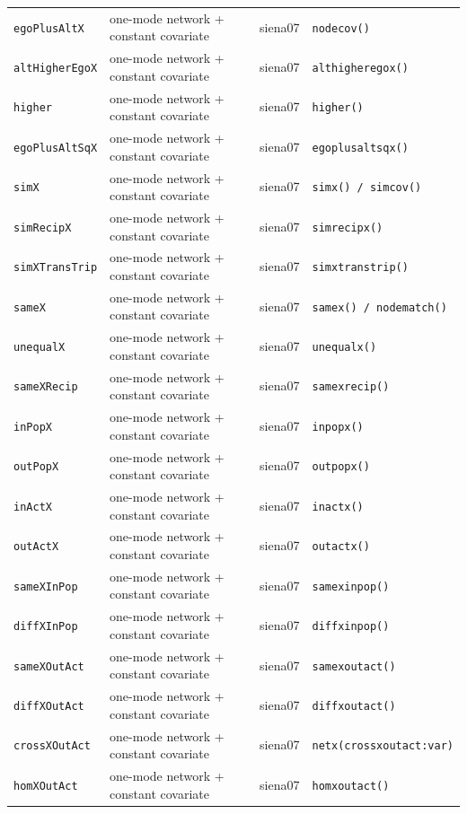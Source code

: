 \begin{longtable}{@{}p{2.6cm}p{3.2cm}p{2.9cm}p{5.4cm}@{}}
\texttt{egoPlusAltX} & one-mode network + constant covariate & siena07 & \texttt{nodecov()}\\
\texttt{altHigherEgoX} & one-mode network + constant covariate & siena07 & \texttt{althigheregox()}\\
\texttt{higher} & one-mode network + constant covariate & siena07 & \texttt{higher()}\\
\texttt{egoPlusAltSqX} & one-mode network + constant covariate & siena07 & \texttt{egoplusaltsqx()}\\
\texttt{simX} & one-mode network + constant covariate & siena07 & \texttt{simx() / simcov()}\\
\texttt{simRecipX} & one-mode network + constant covariate & siena07 & \texttt{simrecipx()}\\
\texttt{simXTransTrip} & one-mode network + constant covariate & siena07 & \texttt{simxtranstrip()}\\
\texttt{sameX} & one-mode network + constant covariate & siena07 & \texttt{samex() / nodematch()}\\
\texttt{unequalX} & one-mode network + constant covariate & siena07 & \texttt{unequalx()}\\
\texttt{sameXRecip} & one-mode network + constant covariate & siena07 & \texttt{samexrecip()}\\
\texttt{inPopX} & one-mode network + constant covariate & siena07 & \texttt{inpopx()}\\
\texttt{outPopX} & one-mode network + constant covariate & siena07 & \texttt{outpopx()}\\
\texttt{inActX} & one-mode network + constant covariate & siena07 & \texttt{inactx()}\\
\texttt{outActX} & one-mode network + constant covariate & siena07 & \texttt{outactx()}\\
\texttt{sameXInPop} & one-mode network + constant covariate & siena07 & \texttt{samexinpop()}\\
\texttt{diffXInPop} & one-mode network + constant covariate & siena07 & \texttt{diffxinpop()}\\
\texttt{sameXOutAct} & one-mode network + constant covariate & siena07 & \texttt{samexoutact()}\\
\texttt{diffXOutAct} & one-mode network + constant covariate & siena07 & \texttt{diffxoutact()}\\
\texttt{crossXOutAct} & one-mode network + constant covariate & siena07 & \texttt{netx(crossxoutact:var)}\\
\texttt{homXOutAct} & one-mode network + constant covariate & siena07 & \texttt{homxoutact()}\\

\end{longtable}
